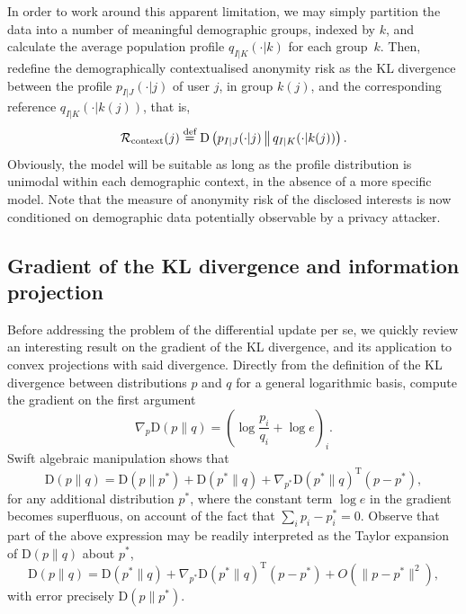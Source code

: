 In order to work around this apparent limitation, we may simply partition the data into a number of meaningful demographic groups, indexed by $k$, and calculate the average population profile $q_{I|K}(\cdot|k)$ for each group~$k$. Then, redefine the demographically contextualised anonymity risk as the KL divergence between the profile $p_{I|J}(\cdot|j)$ of user $j$, in group $k(j)$, and the corresponding reference $q_{I|K}(\cdot|k(j))$, that is,
\begin{equation*}
\mathcal{R}_\text{context}(j)\stackrel{\text{def}}{=}\mathrm{D}\left(p_{I|J}(\cdot|j)\,\middle\|\,q_{I|K}(\cdot|k(j))\right).
\end{equation*}
Obviously, the model will be suitable as long as the profile distribution is unimodal within each demographic context, in the absence of a more specific model. Note that the measure of anonymity risk of the disclosed interests is now conditioned on demographic data potentially observable by a privacy attacker.

\subsection{Gradient of the KL divergence and information projection}
\label{sec:1-3}

\noindent
Before addressing the problem of the differential update per se, we quickly review an interesting result on the gradient of the KL divergence, and its application to convex projections with said divergence. Directly from the definition of the KL divergence between distributions $p$ and $q$ for a general logarithmic basis, compute the gradient on the first argument
\begin{equation*}
\nabla_p\mathrm{D}(p\|q)={\left(\log \frac{p_i}{q_i}+\log e\right)}_i.
\end{equation*}
Swift algebraic manipulation shows that
\begin{equation} \label{eq:gradient}
\mathrm{D}(p\|q)=\mathrm{D}(p\|p^*)+\mathrm{D}(p^*\|q)+\nabla_{p^*}\mathrm{D}(p^*\|q)^\mathrm{T}(p-p^*),
\end{equation}
for any additional distribution $p^*$, where the constant term $\log e$ in the gradient becomes superfluous, on account of the fact that $\sum_i p_i-p_i^*=0$. Observe that part of the above expression may be readily interpreted as the Taylor expansion of $\mathrm{D}(p\|q)$ about $p^*$,
\begin{equation} \label{eq:Taylor}
\mathrm{D}(p\|q)=\mathrm{D}(p^*\|q)+\nabla_{p^*}\mathrm{D}(p^*\|q)^\mathrm{T}(p-p^*)+O(\|p-p^*\|^2),
\end{equation}
with error precisely $\mathrm{D}(p\|p^*)$.

